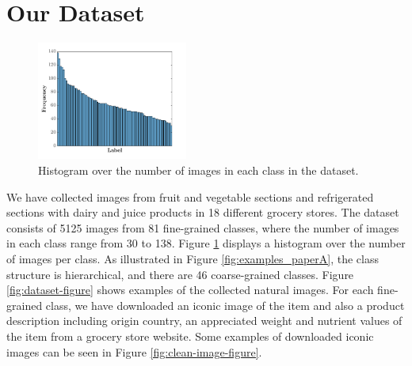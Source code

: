 \section{Our Dataset}\label{paperA:sec:our_dataset}

\begin{figure}
	\centering
	\vspace{-6mm}
	\includegraphics[width=0.44\textwidth]{PaperA/figures/hist1_latex_bf14.png}
	\vspace{-4mm}
	\captionsetup{width=.9\linewidth}
	\caption{Histogram over the number of images in each class in the dataset.}
	\vspace{-2mm}
	\label{fig:hist}
\end{figure}
We have collected images from fruit and vegetable sections and refrigerated sections with dairy and juice products in 18 different grocery stores. The dataset consists of 5125 images from 81 fine-grained classes, where the number of images in each class range from 30 to 138. Figure \ref{fig:hist} displays a histogram over the number of images per class. As illustrated in Figure \ref{fig:examples_paperA}, the class structure is hierarchical, and there are 46 coarse-grained classes. Figure \ref{fig:dataset-figure} shows examples of the collected natural images. For each fine-grained class, we have downloaded an iconic image of the item and also a product description including origin country, an appreciated weight and nutrient values of the item from a grocery store website. Some examples of downloaded iconic images can be seen in Figure \ref{fig:clean-image-figure}. 

